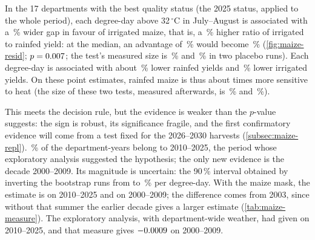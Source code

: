 In the 17 departments with the best quality status (the 2025 status, applied to the whole period), each degree-day above 32\,$^{\circ}$C in July--August is associated with a \QonePct\,\% wider gap in favour of irrigated maize, that is, a \QonePct\,\% higher ratio of irrigated to rainfed yield: at the median, an advantage of \GapMedianPct\,\% would become \GapMedianAfterPct\,\% (\cref{fig:maize-resid}; $p = 0.007$; the test's measured size is \QoneSizeWCR\,\% and \PowerCheckSize\,\% in two placebo runs). Each degree-day is associated with about \QoneRainfedPct\,\% lower rainfed yields and \QoneIrrigatedPct\,\% lower irrigated yields. On these point estimates, rainfed maize is thus about \QoneRatio{} times more sensitive to heat (the size of these two tests, measured afterwards, is \HtwobSize\,\% and \HtwocSize\,\%).

This meets the decision rule, but the evidence is weaker than the $p$-value suggests: the sign is robust, its significance fragile, and the first confirmatory evidence will come from a test fixed for the 2026--2030 harvests (\cref{subsec:maize-repl}). \ExploSharePct\,\% of the department-years belong to 2010--2025, the period whose exploratory analysis suggested the hypothesis; the only new evidence is the decade 2000--2009. Its magnitude is uncertain: the 90\,\% interval obtained by inverting the bootstrap runs from \CiNinetyLow{} to \CiNinetyHigh\,\% per degree-day. With the maize mask, the estimate is \MaskRecent{} on 2010--2025 and \MaskEarly{} on 2000--2009; the difference comes from 2003, since without that summer the earlier decade gives a larger estimate (\cref{tab:maize-measure}). The exploratory analysis, with department-wide weather, had given \AreaRecent{} on 2010--2025, and that measure gives $-0.0009$ on 2000--2009.

